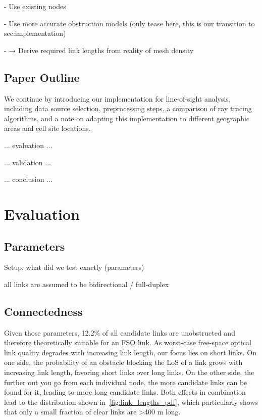 \documentclass[conference]{IEEEtran}
\begin{document}
    - Use existing nodes

    - Use more accurate obstruction models (only tease here, this is our transition to sec:implementation)

    - → Derive required link lengths from reality of mesh density

    \subsection*{Paper Outline}\label{subsec:structure}
    We continue by introducing our implementation for line-of-sight analysis, including data source selection, preprocessing steps, a comparison of ray tracing algorithms, and a note on adapting this implementation to different geographic areas and cell site locations.

    ... evaluation ...

    ... validation ...

    ... conclusion ...



    

    \section{Evaluation}\label{sec:evaluation}

    \subsection{Parameters}\label{subsec:parameters}
    Setup, what did we test exactly (parameters)

    all links are assumed to be bidirectional / full-duplex

    \subsection{Connectedness}\label{subsec:connectedness}
    Given those parameters, 12.2\% of all candidate links are unobstructed and therefore theoretically suitable for an FSO link.
    As worst-case free-space optical link quality degrades with increasing link length, our focus lies on short links.
    On one side, the probability of an obstacle blocking the LoS of a link grows with increasing link length, favoring short links over long links.
    On the other side, the further out you go from each individual node, the more candidate links can be found for it, leading to more long candidate links.
    Both effects in combination lead to the distribution shown in~\cref{fig:link_lengths_pdf}, which particularly shows that only a small fraction of clear links are \textgreater400 m long.
\end{document}
